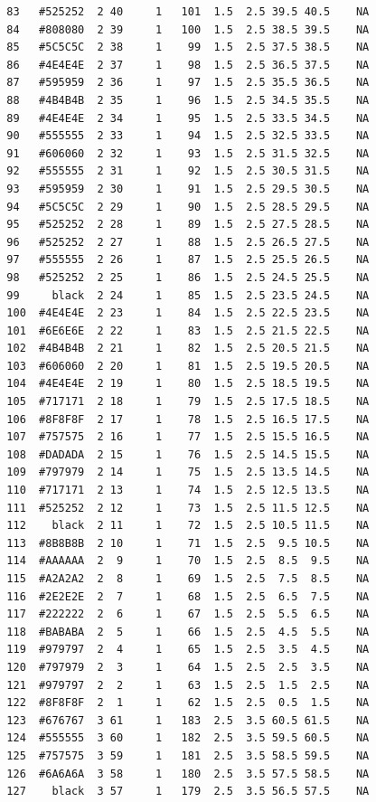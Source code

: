\documentclass[12pt,twoside]{reedthesis}
\begin{document}
\begin{verbatim}
  83   #525252  2 40     1   101  1.5  2.5 39.5 40.5    NA
  84   #808080  2 39     1   100  1.5  2.5 38.5 39.5    NA
  85   #5C5C5C  2 38     1    99  1.5  2.5 37.5 38.5    NA
  86   #4E4E4E  2 37     1    98  1.5  2.5 36.5 37.5    NA
  87   #595959  2 36     1    97  1.5  2.5 35.5 36.5    NA
  88   #4B4B4B  2 35     1    96  1.5  2.5 34.5 35.5    NA
  89   #4E4E4E  2 34     1    95  1.5  2.5 33.5 34.5    NA
  90   #555555  2 33     1    94  1.5  2.5 32.5 33.5    NA
  91   #606060  2 32     1    93  1.5  2.5 31.5 32.5    NA
  92   #555555  2 31     1    92  1.5  2.5 30.5 31.5    NA
  93   #595959  2 30     1    91  1.5  2.5 29.5 30.5    NA
  94   #5C5C5C  2 29     1    90  1.5  2.5 28.5 29.5    NA
  95   #525252  2 28     1    89  1.5  2.5 27.5 28.5    NA
  96   #525252  2 27     1    88  1.5  2.5 26.5 27.5    NA
  97   #555555  2 26     1    87  1.5  2.5 25.5 26.5    NA
  98   #525252  2 25     1    86  1.5  2.5 24.5 25.5    NA
  99     black  2 24     1    85  1.5  2.5 23.5 24.5    NA
  100  #4E4E4E  2 23     1    84  1.5  2.5 22.5 23.5    NA
  101  #6E6E6E  2 22     1    83  1.5  2.5 21.5 22.5    NA
  102  #4B4B4B  2 21     1    82  1.5  2.5 20.5 21.5    NA
  103  #606060  2 20     1    81  1.5  2.5 19.5 20.5    NA
  104  #4E4E4E  2 19     1    80  1.5  2.5 18.5 19.5    NA
  105  #717171  2 18     1    79  1.5  2.5 17.5 18.5    NA
  106  #8F8F8F  2 17     1    78  1.5  2.5 16.5 17.5    NA
  107  #757575  2 16     1    77  1.5  2.5 15.5 16.5    NA
  108  #DADADA  2 15     1    76  1.5  2.5 14.5 15.5    NA
  109  #797979  2 14     1    75  1.5  2.5 13.5 14.5    NA
  110  #717171  2 13     1    74  1.5  2.5 12.5 13.5    NA
  111  #525252  2 12     1    73  1.5  2.5 11.5 12.5    NA
  112    black  2 11     1    72  1.5  2.5 10.5 11.5    NA
  113  #8B8B8B  2 10     1    71  1.5  2.5  9.5 10.5    NA
  114  #AAAAAA  2  9     1    70  1.5  2.5  8.5  9.5    NA
  115  #A2A2A2  2  8     1    69  1.5  2.5  7.5  8.5    NA
  116  #2E2E2E  2  7     1    68  1.5  2.5  6.5  7.5    NA
  117  #222222  2  6     1    67  1.5  2.5  5.5  6.5    NA
  118  #BABABA  2  5     1    66  1.5  2.5  4.5  5.5    NA
  119  #979797  2  4     1    65  1.5  2.5  3.5  4.5    NA
  120  #797979  2  3     1    64  1.5  2.5  2.5  3.5    NA
  121  #979797  2  2     1    63  1.5  2.5  1.5  2.5    NA
  122  #8F8F8F  2  1     1    62  1.5  2.5  0.5  1.5    NA
  123  #676767  3 61     1   183  2.5  3.5 60.5 61.5    NA
  124  #555555  3 60     1   182  2.5  3.5 59.5 60.5    NA
  125  #757575  3 59     1   181  2.5  3.5 58.5 59.5    NA
  126  #6A6A6A  3 58     1   180  2.5  3.5 57.5 58.5    NA
  127    black  3 57     1   179  2.5  3.5 56.5 57.5    NA

\end{verbatim}
\end{document}
